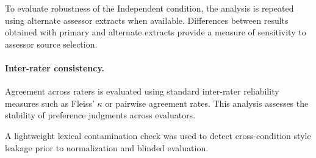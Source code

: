 To evaluate robustness of the Independent condition, the analysis is repeated
using alternate assessor extracts when available. Differences between results
obtained with primary and alternate extracts provide a measure of sensitivity
to assessor source selection.

\paragraph{Inter-rater consistency.}

Agreement across raters is evaluated using standard inter-rater reliability
measures such as Fleiss' $\kappa$ or pairwise agreement rates. This analysis
assesses the stability of preference judgments across evaluators.

A lightweight lexical contamination check was used to detect cross-condition
style leakage prior to normalization and blinded evaluation.